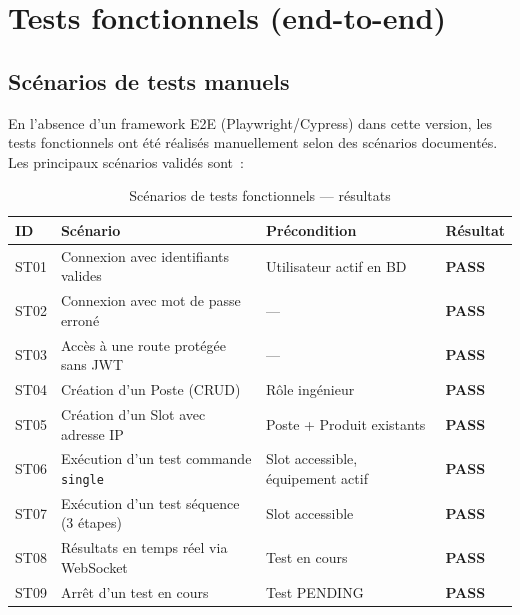 \section{Tests fonctionnels (end-to-end)}

\subsection{Scénarios de tests manuels}

En l'absence d'un framework E2E (Playwright/Cypress) dans cette version,
les tests fonctionnels ont été réalisés manuellement selon des scénarios
documentés. Les principaux scénarios validés sont~:

\begin{table}[H]
  \centering
  \caption{Scénarios de tests fonctionnels — résultats}
  \label{tab:e2e_tests}
  \begin{tabularx}{\textwidth}{L{0.8cm} L{5cm} L{3cm} C{2cm}}
    \toprule
    \textbf{ID} & \textbf{Scénario} & \textbf{Précondition} & \textbf{Résultat} \\
    \midrule
    ST01 & Connexion avec identifiants valides &
           Utilisateur actif en BD & \textcolor{vertCode}{\textbf{PASS}} \\
    ST02 & Connexion avec mot de passe erroné &
           --- & \textcolor{vertCode}{\textbf{PASS}} \\
    ST03 & Accès à une route protégée sans JWT &
           --- & \textcolor{vertCode}{\textbf{PASS}} \\
    ST04 & Création d'un Poste (CRUD) &
           Rôle ingénieur & \textcolor{vertCode}{\textbf{PASS}} \\
    ST05 & Création d'un Slot avec adresse IP &
           Poste + Produit existants & \textcolor{vertCode}{\textbf{PASS}} \\
    ST06 & Exécution d'un test commande \texttt{single} &
           Slot accessible, équipement actif & \textcolor{vertCode}{\textbf{PASS}} \\
    ST07 & Exécution d'un test séquence (3 étapes) &
           Slot accessible & \textcolor{vertCode}{\textbf{PASS}} \\
    ST08 & Résultats en temps réel via WebSocket &
           Test en cours & \textcolor{vertCode}{\textbf{PASS}} \\
    ST09 & Arrêt d'un test en cours &
           Test PENDING & \textcolor{vertCode}{\textbf{PASS}} \\

\end{tabularx}
\end{table}

